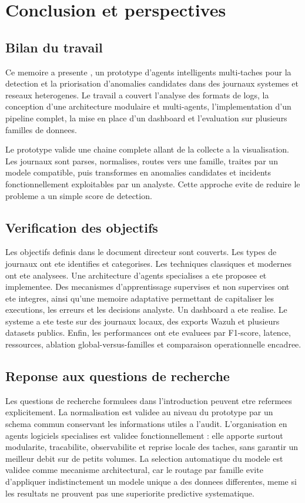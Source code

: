 \chapter{Conclusion et perspectives}

\section{Bilan du travail}
Ce memoire a presente \logminer, un prototype d'agents intelligents multi-taches pour la detection et la priorisation d'anomalies candidates dans des journaux systemes et reseaux heterogenes. Le travail a couvert l'analyse des formats de logs, la conception d'une architecture modulaire et multi-agents, l'implementation d'un pipeline complet, la mise en place d'un dashboard et l'evaluation sur plusieurs familles de donnees.

Le prototype valide une chaine complete allant de la collecte a la visualisation. Les journaux sont parses, normalises, routes vers une famille, traites par un modele compatible, puis transformes en anomalies candidates et incidents fonctionnellement exploitables par un analyste. Cette approche evite de reduire le probleme a un simple score de detection.

\section{Verification des objectifs}
Les objectifs definis dans le document directeur sont couverts. Les types de journaux ont ete identifies et categorises. Les techniques classiques et modernes ont ete analysees. Une architecture d'agents specialises a ete proposee et implementee. Des mecanismes d'apprentissage supervises et non supervises ont ete integres, ainsi qu'une memoire adaptative permettant de capitaliser les executions, les erreurs et les decisions analyste. Un dashboard a ete realise. Le systeme a ete teste sur des journaux locaux, des exports Wazuh et plusieurs datasets publics. Enfin, les performances ont ete evaluees par F1-score, latence, ressources, ablation global-versus-familles et comparaison operationnelle encadree.

\section{Reponse aux questions de recherche}
Les questions de recherche formulees dans l'introduction peuvent etre refermees explicitement. La normalisation est validee au niveau du prototype par un schema commun conservant les informations utiles a l'audit. L'organisation en agents logiciels specialises est validee fonctionnellement : elle apporte surtout modularite, tracabilite, observabilite et reprise locale des taches, sans garantir un meilleur debit sur de petits volumes. La selection automatique du modele est validee comme mecanisme architectural, car le routage par famille evite d'appliquer indistinctement un modele unique a des donnees differentes, meme si les resultats ne prouvent pas une superiorite predictive systematique.

